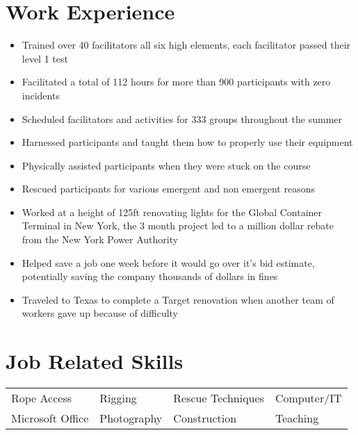 \documentclass{my_resume}
\begin{document}
	\centerheader
	\section{Work Experience}
	
			\begin{itemize}
				\item Trained over 40 facilitators all six high elements, each facilitator passed their level 1 test
				\item Facilitated a total of 112 hours for more than 900 participants with zero incidents
				\item Scheduled facilitators and activities for 333 groups throughout the summer
			\end{itemize}
	
			\begin{itemize}
				\item Harnessed participants and taught them how to properly use their equipment
				\item Physically assisted participants when they were stuck on the course
				\item Rescued participants for various emergent and non emergent reasons
			\end{itemize}
	
			\begin{itemize}
				\item Worked at a height of 125ft renovating lights for the Global Container Terminal in New York, the 3 month project led to a million dollar rebate from the New York Power Authority
				\item Helped save a job one week before it would go over it's bid estimate, potentially saving the company thousands of dollars in fines
				\item Traveled to Texas to complete a Target renovation when another team of workers gave up because of difficulty
			\end{itemize}

	\section{Job Related Skills}
		\setlength{\tabcolsep}{14pt}
		\begin{tabular}{L L L L}
			Rope Access & Rigging & Rescue Techniques & Computer/IT \\
			Microsoft Office & Photography & Construction & Teaching
		\end{tabular}
	
\end{document}

